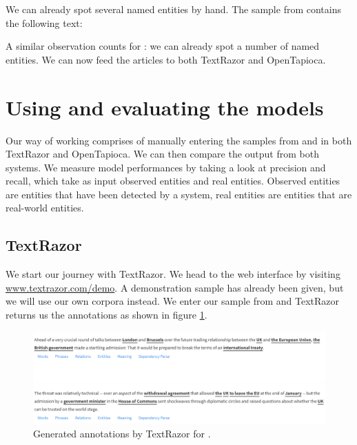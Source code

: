 \documentclass[a4paper, 11pt]{article}
\begin{document}
We can already spot several named entities by hand. The sample from \citet{mckeever_2020} contains the following text:


A similar observation counts for \citet{mckeever_2020}: we can already spot a number of named entities. We can now feed the articles to both TextRazor and OpenTapioca.

\section{Using and evaluating the models}

Our way of working comprises of manually entering the samples from \citet{mcgee_2020} and \citet{mckeever_2020} in both TextRazor and OpenTapioca. We can then compare the output from both systems. We measure model performances by taking a look at precision and recall, which take as input observed entities and real entities. Observed entities are entities that have been detected by a system, real entities are entities that are real-world entities. 

\subsection{TextRazor}

We start our journey with TextRazor. We head to the web interface by visiting \url{www.textrazor.com/demo}. A demonstration sample has already been given, but we will use our own corpora instead. We enter our sample from \citet{mcgee_2020} and TextRazor returns us the annotations as shown in figure \ref{fig:doc1tr}.

\begin{figure}[h]
	\label{fig:doc1tr}
	\includegraphics[width=\textwidth]{doc1_textrazor.png}
	\caption{Generated annotations by TextRazor for \citet{mcgee_2020}.}
\end{figure}
\end{document}
